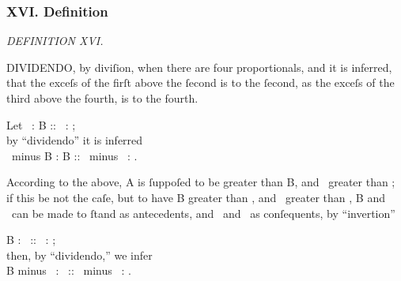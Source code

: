 \documentclass[12pt,preview]{standalone}
\begin{document}
\subsubsection{XVI. Definition}

\begin{minipage}{\textwidth}

    \begin{center}
        \textit{DEFINITION XVI.}\label{book5def16} \\
    \end{center}

    \hfill

    \newcommand{\redA}{{\color{cred}{A}}}
    \newcommand{\blueC}{{\color{cblue}{C}}}
    \newcommand{\yellowD}{{\color{cyellow}{D}}}

    \raggedright D\textsc{IVIDENDO}, by diviſion, when there are four proportionals, and it is inferred, that the exceſs of the firſt above the ſecond is to the ſecond, as the exceſs of the third above the fourth, is to the fourth.\\

    \hfill

    \begin{center}
        Let \redA\ : B :: \blueC\ : \yellowD;\\
        by “dividendo” it is inferred\\
        \redA\ minus B : B :: \blueC\ minus \yellowD\ : \yellowD.
    \end{center}

    \hfill

    According to the above, A is ſuppoſed to be greater than B, and \blueC\ greater than \yellowD; if this be not the caſe, but to have B greater than \redA, and \yellowD\ greater than \blueC, B and \yellowD\ can be made to ſtand as antecedents, and \redA\ and \blueC\ as conſequents, by “invertion”\\

    \hfill

    \begin{center}
        B : \redA\ :: \yellowD\ : \blueC;\\
        then, by “dividendo,” we infer\\
        B minus \redA\ : \redA\ :: \yellowD\ minus \blueC\ : \blueC.
    \end{center}

    \hfill

\end{minipage}
\end{document}
